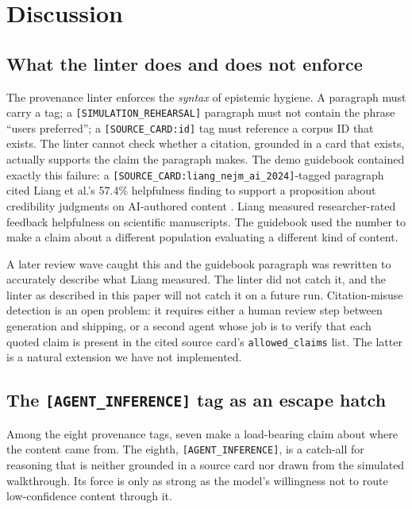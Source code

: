 \section{Discussion}
\label{sec:discussion}

\subsection{What the linter does and does not enforce}

The provenance linter enforces the \emph{syntax} of epistemic hygiene. A paragraph must carry a tag; a \texttt{[SIMULATION\_REHEARSAL]} paragraph must not contain the phrase ``users preferred''; a \texttt{[SOURCE\_CARD:id]} tag must reference a corpus ID that exists. The linter cannot check whether a citation, grounded in a card that exists, actually supports the claim the paragraph makes. The demo guidebook contained exactly this failure: a \texttt{[SOURCE\_CARD:liang\_nejm\_ai\_2024]}-tagged paragraph cited Liang et al.'s 57.4\% helpfulness finding to support a proposition about credibility judgments on AI-authored content \citep{liang2024large}. Liang measured researcher-rated feedback helpfulness on scientific manuscripts. The guidebook used the number to make a claim about a different population evaluating a different kind of content.

A later review wave caught this and the guidebook paragraph was rewritten to accurately describe what Liang measured. The linter did not catch it, and the linter as described in this paper will not catch it on a future run. Citation-misuse detection is an open problem: it requires either a human review step between generation and shipping, or a second agent whose job is to verify that each quoted claim is present in the cited source card's \texttt{allowed\_claims} list. The latter is a natural extension we have not implemented.

\subsection{The \texttt{[AGENT\_INFERENCE]} tag as an escape hatch}

Among the eight provenance tags, seven make a load-bearing claim about where the content came from. The eighth, \texttt{[AGENT\_INFERENCE]}, is a catch-all for reasoning that is neither grounded in a source card nor drawn from the simulated walkthrough. Its force is only as strong as the model's willingness not to route low-confidence content through it.

